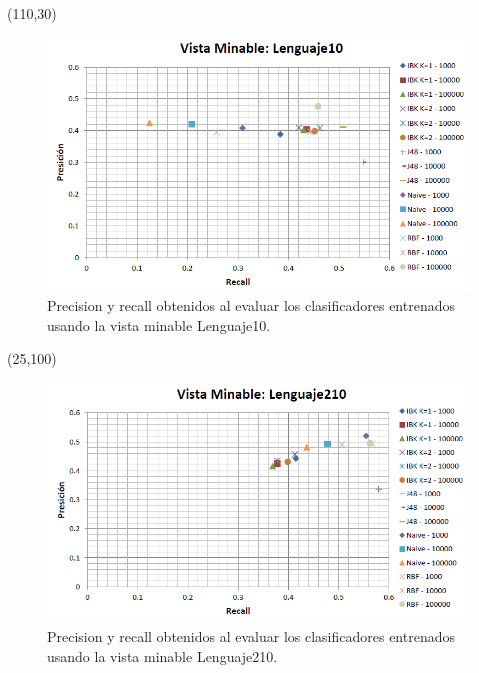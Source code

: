 \documentclass{article}
\begin{document}
\begin{textblock}{80}(110,30)
\begin{figure}[!htb]
\begin{centering}
\includegraphics[scale=0.4]{lenguaje10}
\par\end{centering}
\caption{Precision y recall obtenidos al evaluar los clasificadores entrenados usando la vista minable Lenguaje10.}
\label{fig:figura6}
\end{figure}
\end{textblock}

\begin{textblock}{80}(25,100)
\begin{figure}[!htb]
\begin{centering}
\includegraphics[scale=0.4]{lenguaje210}
\par\end{centering}
\caption{Precision y recall obtenidos al evaluar los clasificadores entrenados usando la vista minable Lenguaje210.}
\label{fig:figura7}
\end{figure}
\end{textblock}
\end{document}
